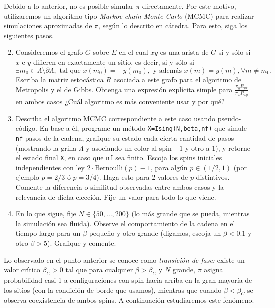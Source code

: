 Debido a lo anterior, no es posible simular $\pi$ directamente. Por este motivo, utilizaremos un algoritmo tipo \emph{Markov chain Monte Carlo} (MCMC) para realizar simulaciones aproximadas de $\pi$, según lo descrito en cátedra. Para esto, siga los siguientes pasos.

\begin{enumerate}
	\setcounter{enumi}{1}
	\item Consideremos el grafo $G$ sobre $E$ en el cual $xy$ es una arista de $G$ si y sólo si $x$ e $y$ difieren en exactamente un sitio, es decir, si y sólo si
	\[
	\exists m_0 \in \Lambda \setminus \partial \Lambda,
	\text{ tal que }
	x(m_0) = -y(m_0),
	\text{ y además }
	x(m) = y(m), \forall m\neq m_0.
	\]
	Escriba la matriz estocástica $R$ asociada a este grafo para el algoritmo de Metropolis y el de Gibbs. Obtenga una expresión explícita simple para $\frac{\pi_y R_{yx}}{\pi_x R_{xy}}$ en ambos casos ¿Cuál algoritmo es más conveniente usar y por qué?
	
        \item Describa el algoritmo MCMC correspondiente a este caso usando pseudo-código. En base a él, programe un método \texttt{X=Ising(N,beta,nf)} que simule \texttt{nf} pasos de la cadena, grafique su estado cada cierta cantidad de pasos (mostrando la grilla $\Lambda$ y asociando un color al spin $-1$ y otro a $1$), y retorne el estado final \texttt{X}, en caso que \texttt{nf} sea finito. Escoja los spins iniciales independientes con ley $2\cdot\text{Bernoulli}(p)-1$, para algún $p\in(1/2, 1)$ (por ejemplo $p=2/3$ ó $p=3/4$). Haga esto para 2 valores de $p$ distintivos. Comente la diferencia o similitud observadas entre ambos casos y la relevancia de dicha elección. Fije un valor para todo lo que viene.
	
	\item En lo que sigue, fije $N \in \{50,\ldots,200\}$ (lo más grande que se pueda, mientras la simulación sea fluida). Observe el comportamiento de la cadena en el tiempo largo para un $\beta$ pequeño y otro grande (digamos, escoja un $\beta<0.1$ y otro $\beta>5$). Grafique y comente.
\end{enumerate}

Lo observado en el punto anterior se conoce como \emph{transición de fase:} existe un valor crítico $\beta_C>0$ tal que para cualquier $\beta>\beta_C$ y $N$ grande, $\pi$ asigna probabilidad casi 1 a configuraciones con spin hacia arriba en la gran mayoría de los sitios (con la condición de borde que usamos), mientras que cuando $\beta<\beta_C$ se observa coexistencia de ambos spins. A continuación estudiaremos este fenómeno.

